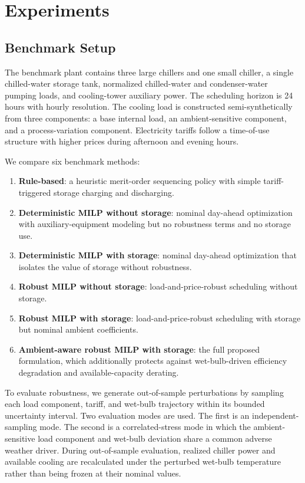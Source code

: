 \section{Experiments}
\label{sec:experiments}

\subsection{Benchmark Setup}

The benchmark plant contains three large chillers and one small chiller, a single chilled-water storage tank, normalized chilled-water and condenser-water pumping loads, and cooling-tower auxiliary power. The scheduling horizon is 24 hours with hourly resolution. The cooling load is constructed semi-synthetically from three components: a base internal load, an ambient-sensitive component, and a process-variation component. Electricity tariffs follow a time-of-use structure with higher prices during afternoon and evening hours.

We compare six benchmark methods:
\begin{enumerate}[leftmargin=1.5em]
    \item \textbf{Rule-based}: a heuristic merit-order sequencing policy with simple tariff-triggered storage charging and discharging.
    \item \textbf{Deterministic MILP without storage}: nominal day-ahead optimization with auxiliary-equipment modeling but no robustness terms and no storage use.
    \item \textbf{Deterministic MILP with storage}: nominal day-ahead optimization that isolates the value of storage without robustness.
    \item \textbf{Robust MILP without storage}: load-and-price-robust scheduling without storage.
    \item \textbf{Robust MILP with storage}: load-and-price-robust scheduling with storage but nominal ambient coefficients.
    \item \textbf{Ambient-aware robust MILP with storage}: the full proposed formulation, which additionally protects against wet-bulb-driven efficiency degradation and available-capacity derating.
\end{enumerate}

To evaluate robustness, we generate out-of-sample perturbations by sampling each load component, tariff, and wet-bulb trajectory within its bounded uncertainty interval. Two evaluation modes are used. The first is an independent-sampling mode. The second is a correlated-stress mode in which the ambient-sensitive load component and wet-bulb deviation share a common adverse weather driver. During out-of-sample evaluation, realized chiller power and available cooling are recalculated under the perturbed wet-bulb temperature rather than being frozen at their nominal values.

